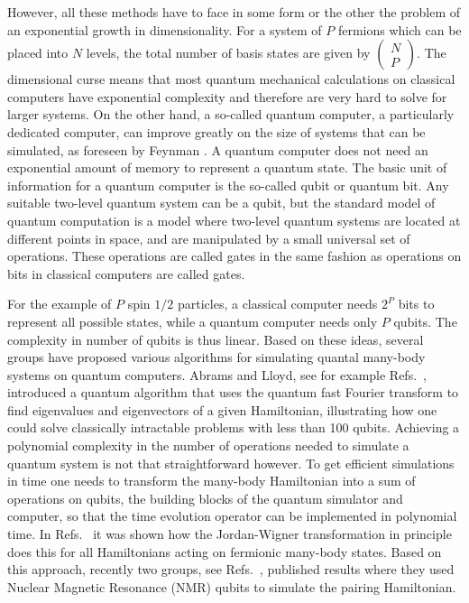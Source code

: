 However, all these methods have to face in some form or the other the problem of 
an exponential growth in dimensionality. For a system of $P$ fermions
which 
can be placed 
into $N$ levels, the total number of basis states are given by
$\left(\begin{array}{c}N\\P\end{array}\right)$.
The dimensional curse means that most quantum
mechanical calculations on classical computers have exponential
complexity and therefore are very hard to solve for larger systems. On 
the other hand, a so-called 
quantum computer, a particularly dedicated computer,
can improve greatly on the size of systems that can be simulated, as
foreseen by Feynman \cite{feynman1982,feynman1986}. A quantum computer 
does not need
an exponential amount of memory to represent a quantum state.  
The basic unit of information for a  quantum computer 
is the so-called qubit or quantum bit. Any
suitable 
two-level quantum system can be a qubit, but the  
standard model of quantum computation is a model where two-level
quantum systems are located at different points in
space, and are manipulated by a small universal set of  operations.
These operations are called gates in the same fashion as operations on
bits in classical computers are called gates. 

For the example of $P$ spin $1/2$  particles, 
a classical computer needs $2^P$ bits to represent all possible states, while  
a quantum computer needs only $P$ qubits. The complexity in
number of qubits is thus linear.  Based on these ideas, several groups have proposed
various algorithms for simulating quantal many-body systems on quantum computers.
Abrams 
and  Lloyd, see for example Refs.~\cite{lloyd1997,lloyd1999a}, introduced a  
quantum algorithm that uses the quantum fast Fourier transform to find 
eigenvalues and eigenvectors of a given Hamiltonian,
illustrating how one could solve classically intractable problems with  
less than 100 qubits.
Achieving a polynomial complexity in the number of operations needed
to simulate a quantum system is not that straightforward however.
To get efficient simulations in time one
needs to transform the  many-body Hamiltonian into a sum of operations
on qubits, the building blocks of the quantum simulator and computer,
so that the time evolution operator can be implemented in polynomial
time. 
In Refs.~\cite{somma2002,somma2005,ortiz2002} it was shown how the
Jordan-Wigner 
transformation in principle
does this for all Hamiltonians acting on fermionic many-body states.
Based on this approach, recently two groups, see Refs.~\cite{krbrown2006,yang2006}, published 
results where 
they used Nuclear Magnetic Resonance (NMR) qubits to simulate the
pairing Hamiltonian.  


